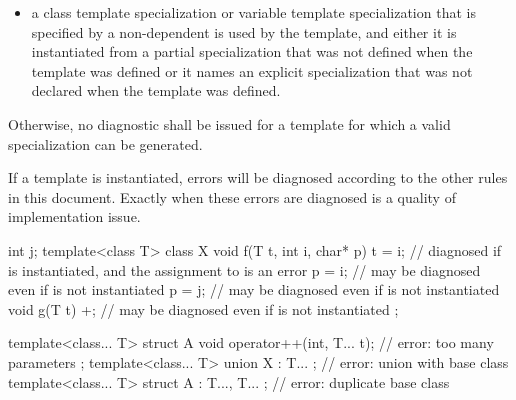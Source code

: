 \begin{itemize}
\begin{note}
\begin{itemize}
\item a class template specialization or variable template specialization that
is specified by a non-dependent  is used by
the template, and either it is instantiated from a partial specialization that
was not defined when the template was defined or it names an explicit
specialization that was not declared when the template was defined.
\end{itemize}
\end{note}
\end{itemize}

Otherwise, no diagnostic shall be issued for a template
for which a valid specialization can be generated.
\begin{note}
If a template is instantiated, errors will be diagnosed according
to the other rules in this document.
Exactly when these errors are diagnosed is a quality of implementation issue.
\end{note}
\begin{example}
\begin{codeblock}
int j;
template<class T> class X {
  void f(T t, int i, char* p) {
    t = i;          // diagnosed if  is instantiated, and the assignment to  is an error
    p = i;          // may be diagnosed even if  is not instantiated
    p = j;          // may be diagnosed even if  is not instantiated
  }
  void g(T t) {
    +;              // may be diagnosed even if  is not instantiated
  }
};

template<class... T> struct A {
  void operator++(int, T... t);                     // error: too many parameters
};
template<class... T> union X : T... { };            // error: union with base class
template<class... T> struct A : T...,  T... { };    // error: duplicate base class
\end{codeblock}
\end{example}

